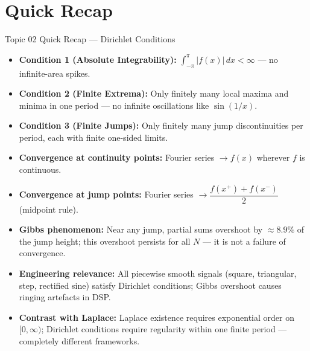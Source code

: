 \documentclass[12pt,a4paper]{article}
\begin{document}
\section{Quick Recap}

\begin{learnbox}{Topic 02 Quick Recap --- Dirichlet Conditions}
\begin{itemize}[noitemsep]
   \item \textbf{Condition 1 (Absolute Integrability):} $\int_{-\pi}^{\pi}|f(x)|\,dx < \infty$ --- no infinite-area spikes.
   \item \textbf{Condition 2 (Finite Extrema):} Only finitely many local maxima and minima in one period --- no infinite oscillations like $\sin(1/x)$.
   \item \textbf{Condition 3 (Finite Jumps):} Only finitely many jump discontinuities per period, each with finite one-sided limits.
   \item \textbf{Convergence at continuity points:} Fourier series $\to f(x)$ wherever $f$ is continuous.
   \item \textbf{Convergence at jump points:} Fourier series $\to \dfrac{f(x^+)+f(x^-)}{2}$ (midpoint rule).
   \item \textbf{Gibbs phenomenon:} Near any jump, partial sums overshoot by $\approx 8.9\%$ of the jump height; this overshoot persists for all $N$ --- it is not a failure of convergence.
   \item \textbf{Engineering relevance:} All piecewise smooth signals (square, triangular, step, rectified sine) satisfy Dirichlet conditions; Gibbs overshoot causes ringing artefacts in DSP.
   \item \textbf{Contrast with Laplace:} Laplace existence requires exponential order on $[0,\infty)$; Dirichlet conditions require regularity within one finite period --- completely different frameworks.
\end{itemize}
\end{learnbox}
\end{document}
